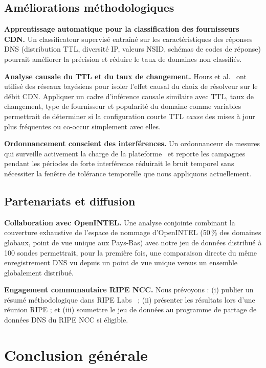 \subsection{Améliorations méthodologiques}
\label{subsec:5.4.3}

\textbf{Apprentissage automatique pour la classification des fournisseurs CDN.}
Un classificateur supervisé entraîné sur les caractéristiques des réponses DNS (distribution TTL, diversité IP, valeurs NSID, schémas de codes de réponse) pourrait améliorer la précision et réduire le taux de domaines non classifiés.

\textbf{Analyse causale du TTL et du taux de changement.}
Hours et al.~\cite{Hours2016} ont utilisé des réseaux bayésiens pour isoler l'effet causal du choix de résolveur sur le débit CDN. Appliquer un cadre d'inférence causale similaire avec TTL, taux de changement, type de fournisseur et popularité du domaine comme variables permettrait de déterminer si la configuration courte TTL \textit{cause} des mises à jour plus fréquentes ou co-occur simplement avec elles.

\textbf{Ordonnancement conscient des interférences.}
Un ordonnanceur de mesures qui surveille activement la charge de la plateforme~\cite{Holterbach2015} et reporte les campagnes pendant les périodes de forte interférence réduirait le bruit temporel sans nécessiter la fenêtre de tolérance temporelle que nous appliquons actuellement.
\bigskip
\subsection{Partenariats et diffusion}
\label{subsec:5.4.4}

\textbf{Collaboration avec OpenINTEL.}
Une analyse conjointe combinant la couverture exhaustive de l'espace de nommage d'OpenINTEL (50\,\% des domaines globaux, point de vue unique aux Pays-Bas) avec notre jeu de données distribué à 100 sondes permettrait, pour la première fois, une comparaison directe du même enregistrement DNS vu depuis un point de vue unique versus un ensemble globalement distribué.

\textbf{Engagement communautaire RIPE NCC.}
Nous prévoyons : (i) publier un résumé méthodologique dans RIPE Labs~\cite{Bortzmeyer2013,Finnegan2018} ; (ii) présenter les résultats lors d'une réunion RIPE ; et (iii) soumettre le jeu de données au programme de partage de données DNS du RIPE NCC si éligible.
\bigskip
\section{Conclusion générale}
\label{sec:5.5}

